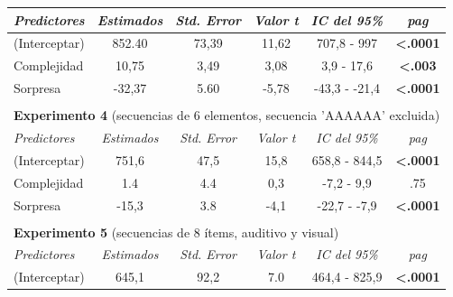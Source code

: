 \begin{table}[]
\begin{tabular}{lccccc}
\textit{Predictores}          & \textit{Estimados}   & \textit{Std. Error}  & \textit{Valor t}     & \textit{IC del 95\%} & \textit{pag}              \\ \hline
(Interceptar)                 & 852.40               & 73,39                & 11,62                & 707,8 - 997          & \textbf{\textless{}.0001} \\
Complejidad                   & 10,75                & 3,49                 & 3,08                 & 3,9 - 17,6           & \textbf{\textless{}.003}  \\
Sorpresa                      & -32,37               & 5.60                 & -5,78                & -43,3 - -21,4        & \textbf{\textless{}.0001} \\ \hline
\multicolumn{1}{c}{\textbf{}} & \multicolumn{1}{l}{} & \multicolumn{1}{l}{} & \multicolumn{1}{l}{} & \multicolumn{1}{l}{} & \multicolumn{1}{l}{}      \\
\multicolumn{6}{l}{\textbf{Experimento 4} (secuencias de 6 elementos, secuencia 'AAAAAA' excluida)}                                                   \\ \hline
\textit{Predictores}          & \textit{Estimados}   & \textit{Std. Error}  & \textit{Valor t}     & \textit{IC del 95\%} & \textit{pag}              \\ \hline
(Interceptar)                 & 751,6                & 47,5                 & 15,8                 & 658,8 - 844,5        & \textbf{\textless{}.0001} \\
Complejidad                   & 1.4                  & 4.4                  & 0,3                  & -7,2 - 9,9           & .75                       \\
Sorpresa                      & -15,3                & 3.8                  & -4,1                 & -22,7 - -7,9         & \textbf{\textless{}.0001} \\ \hline
\multicolumn{1}{c}{\textbf{}} & \multicolumn{1}{l}{} & \multicolumn{1}{l}{} & \multicolumn{1}{l}{} & \multicolumn{1}{l}{} & \multicolumn{1}{l}{}      \\
\multicolumn{6}{l}{\textbf{Experimento 5} (secuencias de 8 ítems, auditivo y visual)}                                                                 \\ \hline
\textit{Predictores}          & \textit{Estimados}   & \textit{Std. Error}  & \textit{Valor t}     & \textit{IC del 95\%} & \textit{pag}              \\ \hline
(Interceptar)                 & 645,1                & 92,2                 & 7.0                  & 464,4 - 825,9        & \textbf{\textless{}.0001} \\

\end{tabular}
\end{table}
